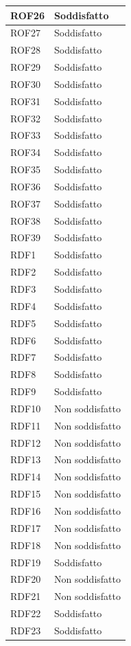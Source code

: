 \begin{longtable}{| p{2.5cm} | p{3cm} |}
	ROF26 & Soddisfatto \\ \hline
	ROF27 & Soddisfatto \\ \hline
	ROF28 & Soddisfatto \\ \hline
	ROF29 & Soddisfatto \\ \hline
	ROF30 & Soddisfatto \\ \hline
	ROF31 & Soddisfatto \\ \hline
	ROF32 & Soddisfatto \\ \hline
	ROF33 & Soddisfatto \\ \hline
	ROF34 & Soddisfatto \\ \hline
	ROF35 & Soddisfatto \\ \hline
	ROF36 & Soddisfatto \\ \hline
	ROF37 & Soddisfatto \\ \hline
	ROF38 & Soddisfatto \\ \hline
	ROF39 & Soddisfatto \\ \hline
	RDF1 & Soddisfatto \\ \hline
	RDF2 & Soddisfatto \\ \hline
	RDF3 & Soddisfatto \\ \hline
	RDF4 & Soddisfatto \\ \hline
	RDF5 & Soddisfatto \\ \hline
	RDF6 & Soddisfatto \\ \hline
	RDF7 & Soddisfatto \\ \hline
	RDF8 & Soddisfatto \\ \hline
	RDF9 & Soddisfatto \\ \hline
	RDF10 & Non soddisfatto \\ \hline
	RDF11 & Non soddisfatto \\ \hline
	RDF12 & Non soddisfatto \\ \hline
	RDF13 & Non soddisfatto \\ \hline
	RDF14 & Non soddisfatto \\ \hline
	RDF15 & Non soddisfatto \\ \hline
	RDF16 & Non soddisfatto \\ \hline
	RDF17 & Non soddisfatto \\ \hline
	RDF18 & Non soddisfatto \\ \hline
	RDF19 & Soddisfatto \\ \hline
	RDF20 & Non soddisfatto \\ \hline
	RDF21 & Non soddisfatto \\ \hline
	RDF22 & Soddisfatto\\ \hline
	RDF23 & Soddisfatto \\ \hline

\end{longtable}
